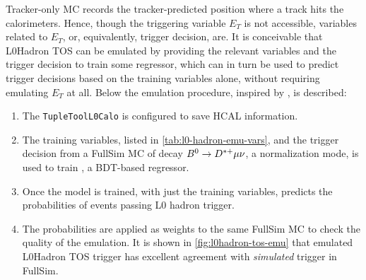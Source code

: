 Tracker-only MC records the tracker-predicted position where a track hits the
calorimeters.
Hence, though the triggering variable $E_T$ is not accessible,
variables related to $E_T$, or, equivalently, trigger decision, are.
It is conceivable that L0Hadron TOS can be emulated by providing
the relevant variables and the trigger decision to train some regressor,
which can in turn be used to predict trigger decisions based on the training
variables alone, without requiring emulating $E_T$ at all.
Below the emulation procedure, inspired by \cite{LHCb-INT-2019-025}, is
described:

\begin{enumerate}
    \item The \lstinline{TupleToolL0Calo} is configured to save HCAL
        information.
    \item The training variables, listed in \cref{tab:l0-hadron-emu-vars}, and
        the trigger decision from a FullSim MC of decay
        ${{B}^0} \rightarrow {\ensuremath{{D}^{*+}}} \mu \nu$, a normalization mode,
        is used to train \xgboost, a BDT-based regressor.
    \item Once the model is trained, with just the training variables,
        \xgboost predicts the probabilities of events passing L0 hadron trigger.
    \item The probabilities are applied as weights to the same FullSim MC
        to check the quality of the emulation.
        It is shown in \cref{fig:l0hadron-tos-emu} that emulated L0Hadron TOS
        trigger has excellent agreement with \emph{simulated} trigger in
        FullSim.
\end{enumerate}

